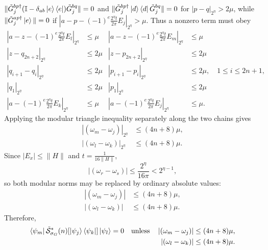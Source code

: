 \documentclass[aps,floatfix,10pt,amssymb,amsfont,amsmath,superscriptaddress,float,nofootinbib,longbibliography,nobalancelastpage,twocolumn]{revtex4-2}
\begin{document}
$\|\tilde G^{bp\dagger}_{j}(\mathbb{I} - \delta_{ab}\ket{e}\bra{e})\tilde G^{bq}_{j}\| = 0$ and
$\|\tilde G^{bp\dagger}_{j}\ket{d}\bra{d}\tilde G^{bq}_{j}\| = 0$
for $|p-q|_{2^{\eta}} > 2\mu$, while
$\|\tilde G^{ap \dagger}_j \ket{e}\| = 0$ if
$|a-p-(-1)^e\frac{2^{\eta}t}{2\pi}E_j|_{2^\eta}>\mu$.  Thus a nonzero
term must obey
\begin{equation}
\begin{aligned}
    |a-z-(-1)^e\tfrac{2^{\eta}t}{2\pi}E_l|_{2^{\eta}} &\leq \mu
    &|a-z-(-1)^e\tfrac{2^{\eta}t}{2\pi}E_m|_{2^{\eta}} &\leq \mu\\
    |z-q_{2n+2}|_{2^{\eta}} &\leq 2\mu & |z-p_{2n+2}|_{2^{\eta}} &\leq 2\mu\\
    |q_{i+1}-q_i|_{2^{\eta}} &\leq 2\mu
    &|p_{i+1}-p_i|_{2^{\eta}} &\leq 2\mu,\quad 1\leq i\leq2n+1,\\
    |q_1|_{2^{\eta}} &\leq 2\mu & |p_1|_{2^{\eta}} &\leq 2\mu\\
    |a-(-1)^{e}\tfrac{2^{\eta}t}{2\pi}E_k|_{2^{\eta}} &\leq \mu
    &|a-(-1)^{e}\tfrac{2^{\eta}t}{2\pi}E_j|_{2^{\eta}}& \leq \mu.
\end{aligned}
\label{eq:conjE}
\end{equation}
Applying the modular triangle inequality separately along the two chains gives
\begin{equation}
\begin{aligned}
    \left|(\omega_{m}-\omega_{j})\right|_{2^{\eta}}&\leq(4n+8)\mu,\\
    \left|(\omega_{l}-\omega_{k})\right|_{2^{\eta}}&\leq(4n+8)\mu.
\end{aligned}
\end{equation}
Since $|E_x|\leq\|H\|$ and $t=\frac{1}{16\|H\|}$,
\begin{equation*}
    \left|(\omega_{r}-\omega_{s})\right|
    \leq \frac{2^{\eta}}{16\pi}<2^{\eta-1},
\end{equation*}
so both modular norms may be replaced by ordinary absolute values:
\begin{equation}
\label{eq:energiessame}
\begin{aligned}
    \left|(\omega_{m}-\omega_{j})\right|&\leq(4n+8)\mu,\\
    \left|(\omega_{l}-\omega_{k})\right|&\leq(4n+8)\mu.
\end{aligned}
\end{equation}
Therefore,
\begin{equation}
\begin{aligned}
    \bra{\psi_m}\tilde{\mathcal{S}}^*_{\sigma_G}(n)[\ket{\psi_j}\bra{\psi_k}]\ket{\psi_l}=0\quad\text{unless}\quad
    \left|(\omega_{m}-\omega_{j})\right|&\leq(4n+8)\mu,\\
    \left|(\omega_{l}-\omega_{k})\right|&\leq(4n+8)\mu.
\end{aligned}
\end{equation}
\end{document}
